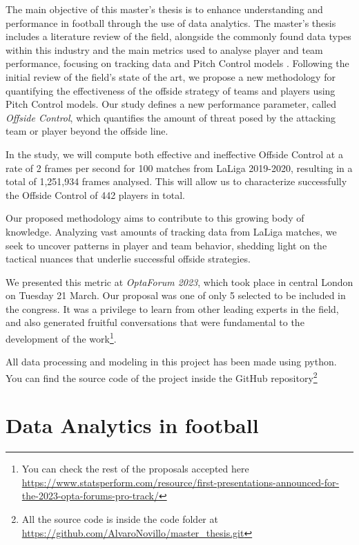 \documentclass[
  10pt,
  twoside,nohyper]{book}
\begin{document}
The main objective of this master's thesis is to enhance understanding and performance in football through the use of data analytics. The master's thesis includes a literature review of the field, alongside the commonly found data types within this industry and the main metrics used to analyse player and team performance, focusing on tracking data and Pitch Control models \autocite{Spearman}. Following the initial review of the field's state of the art, we propose a new methodology for quantifying the effectiveness of the offside strategy of teams and players using Pitch Control models. Our study defines a new performance parameter, called \emph{Offside Control}, which quantifies the amount of threat posed by the attacking team or player beyond the offside line.

In the study, we will compute both effective and ineffective Offside Control at a rate of 2 frames per second for 100 matches from LaLiga 2019-2020, resulting in a total of 1,251,934 frames analysed. This will allow us to characterize successfully the Offside Control of 442 players in total.

Our proposed methodology aims to contribute to this growing body of knowledge. Analyzing vast amounts of tracking data from LaLiga matches, we seek to uncover patterns in player and team behavior, shedding light on the tactical nuances that underlie successful offside strategies.

We presented this metric at \emph{OptaForum 2023}, which took place in central London on Tuesday 21 March. Our proposal was one of only 5 selected to be included in the congress. It was a privilege to learn from other leading experts in the field, and also generated fruitful conversations that were fundamental to the development of the work\footnote{You can check the rest of the proposals accepted here \url{https://www.statsperform.com/resource/first-presentations-announced-for-the-2023-opta-forums-pro-track/}}.

All data processing and modeling in this project has been made using python. You can find the source code of the project inside the GitHub repository\footnote{All the source code is inside the code folder at \url{https://github.com/AlvaroNovillo/master_thesis.git}}

\chapter{Data Analytics in football}\label{data-analytics-in-football}
\end{document}
